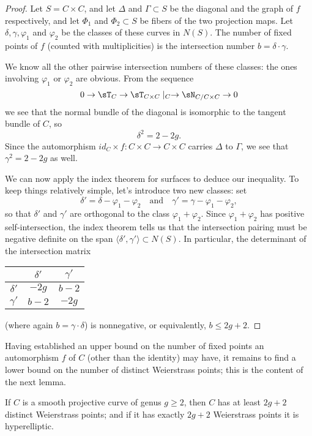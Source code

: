 \begin{proof}
Let $S = C\times C$, and let $\Delta$ and $\Gamma \subset S$ be the diagonal and the graph of $f$ respectively, and let $\Phi_1$ and $\Phi_2 \subset S$ be fibers of the two projection maps. Let $\delta, \gamma, \varphi_1$ and $\varphi_2$ be the classes of these curves in  $N(S)$. The number of fixed points of $f$ (counted with multiplicities) is the intersection number  $b = \delta \cdot \gamma$.

We know all the other pairwise intersection numbers of these classes: the ones involving $\varphi_1$ or $\varphi_2$ are obvious. From the sequence
$$
0\to \sT_{C} \to \sT_{C\times C}\mid_{C} \to \sN_{C/C\times C} \to 0
$$
we see that the normal bundle of the diagonal is isomorphic to the tangent bundle of $C$, so
$$
\delta^2 = 2 - 2g.
$$
Since the automorphism $id_C \times f : C\times C \to C \times C$ carries $\Delta$ to $\Gamma$, we see that $\gamma^2 = 2-2g$ as well.

We can now apply the index theorem for surfaces to deduce our inequality. To keep things relatively simple, let's introduce two new classes: set
$$
\delta' = \delta - \varphi_1 - \varphi_2 \quad \text{and} \quad \gamma' = \gamma - \varphi_1 - \varphi_2,
$$
so that $\delta'$ and $\gamma'$ are orthogonal to the class $\varphi_1 + \varphi_2$. Since $\varphi_1 + \varphi_2$ has positive self-intersection, the index theorem  tells us that the intersection pairing must be negative definite on the span $\langle \delta',\gamma' \rangle \subset N(S)$. In particular, the determinant of the intersection matrix
\begin{center}
\begin{tabular}{c|c|c}
& $\delta'$ &  $\gamma'$  \\
\hline
$\delta'$ & $-2g$ & $b-2$ \\
\hline
$\gamma'$ & $b-2$ & $-2g$ 
\end{tabular}
\end{center}
(where again $b = \gamma \cdot \delta$) is nonnegative, or equivalently, $b\leq 2g+2$.
\end{proof}

Having established an upper  bound on the number of fixed points an automorphism $f$ of $C$ (other than the identity) may have, it remains to find a lower bound on the number of distinct Weierstrass points; this is the content of the next lemma.


\begin{lemma}
If $C$ is a smooth projective curve of genus $g \geq 2$, then $C$ has at least $2g+2$ distinct Weierstrass points; and if it has exactly $2g+2$ Weierstrass points it is hyperelliptic.
\end{lemma}

